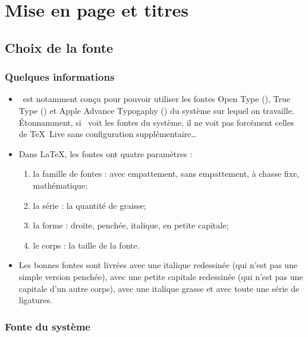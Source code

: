 \chapter{Mise en page et titres}
\label{ch:miseEnPage}





\section{Choix de la fonte}



\subsection{Quelques informations}
\begin{itemize}
	\item \XeLaTeX \ est notamment conçu pour pouvoir utiliser les fontes Open Type (), True Type () et Apple Advance Typogaphy () du système sur lequel on travaille. Étonnamment, si \XeLaTeX \ voit les fontes du système, il ne voit pas forcément celles de \TeX \ Live sans configuration supplémentaire\dots
	
	\item Dans \LaTeX, les fontes ont quatre paramètres :
	\begin{enumerate}
		\item la famille de fontes : avec empattement, sans empattement, à chasse fixe, mathématique;
		\item la série : la quantité de graisse;
		\item la forme : droite, penchée, italique, en petite capitale;
		\item le corps : la taille de la fonte.
	\end{enumerate}
	\item Les bonnes fontes sont livrées avec une italique redessinée (qui n'est pas une simple version penchée), avec une petite capitale redessinée (qui n'est pas une capitale d'un autre corps), avec une italique grasse et avec toute une série de ligatures.
\end{itemize}



\subsection{Fonte du système}

